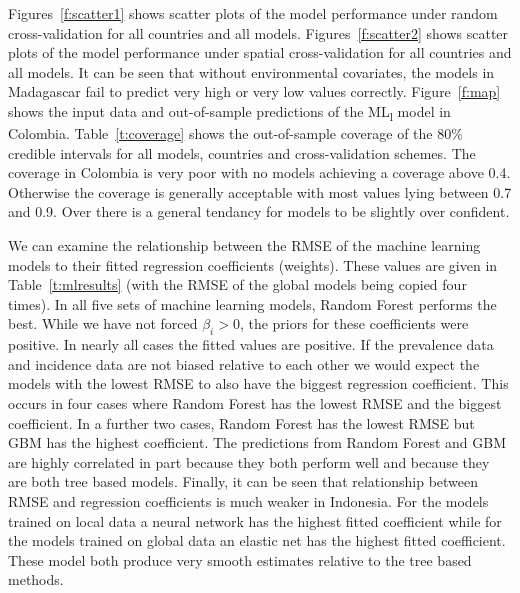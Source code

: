 \documentclass[11pt]{article}
\begin{document}
Figures~\ref{f:scatter1} shows scatter plots of the model performance under random cross-validation for all countries and all models.
Figures~\ref{f:scatter2} shows scatter plots of the model performance under spatial cross-validation for all countries and all models.
It can be seen that without environmental covariates, the models in Madagascar fail to predict very high or very low values correctly.
Figure~\ref{f:map} shows the input data and out-of-sample predictions of the ML\textsubscript{l} model in Colombia.
Table~\ref{t:coverage} shows the out-of-sample coverage of the 80\% credible intervals for all models, countries and cross-validation schemes.
The coverage in Colombia is very poor with no models achieving a coverage above 0.4.
Otherwise the coverage is generally acceptable with most values lying between 0.7 and 0.9.
Over there is a general tendancy for models to be slightly over confident.


We can examine the relationship between the RMSE of the machine learning models to their fitted regression coefficients (weights).
These values are given in Table~\ref{t:mlresults} (with the RMSE of the global models being copied four times).
In all five sets of machine learning models, Random Forest performs the best.
While we have not forced $\beta_i > 0$, the priors for these coefficients were positive.
In nearly all cases the fitted values are positive.
If the prevalence data and incidence data are not biased relative to each other we would expect the models with the lowest RMSE to also have the biggest regression coefficient.
This occurs in four cases where Random Forest has the lowest RMSE and the biggest coefficient.
In a further two cases, Random Forest has the lowest RMSE but GBM has the highest coefficient.
The predictions from Random Forest and GBM are highly correlated in part because they both perform well and because they are both tree based models.
Finally, it can be seen that relationship between RMSE and regression coefficients is much weaker in Indonesia.
For the models trained on local data a neural network has the highest fitted coefficient while for the models trained on global data an elastic net has the highest fitted coefficient.
These model both produce very smooth estimates relative to the tree based methods.
\end{document}
